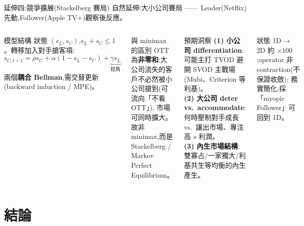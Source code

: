 \documentclass[aspectratio=169,11pt,fontset=none]{ctexbeamer}
\begin{document}
\begin{frame}{延伸四:競爭擴展(Stackelberg 賽局)}
  自然延伸:大小公司賽局 —— Leader(Netflix)先動,Follower(Apple TV+)觀察後反應。
  \begin{columns}[T]
      \begin{block}{模型結構}
        \footnotesize
        狀態 $(s_L,s_C)$,$s_L+s_C\le1$。轉移加入對手搶客項:
        \[ s_{C,t+1}=\rho s_C+\alpha(1-s_L-s_C)+\underbrace{\gamma s_L}_{\text{挖角}} \]
        兩個\textbf{耦合 Bellman},需交替更新(backward induction / MPE)。
      \end{block}
      \begin{alertblock}{與 minimax 的區別}
        \footnotesize OTT 為\textbf{非零和}:大公司流失的客戶不必然被小公司搶到(可流向「不看 OTT」),
        市場可同時擴大。故非 minimax,而是 Stackelberg / Markov Perfect Equilibrium。
      \end{alertblock}
      \begin{exampleblock}{預期洞察}
        \footnotesize
        \textbf{(1) 小公司 differentiation}:可能主打 TVOD 避開 SVOD 主戰場(Mubi、Criterion 等利基)。\\
        \textbf{(2) 大公司 deter vs.\ accommodate}:何時壓制對手成長 vs.\ 讓出市場、專注高 $s$ 利潤。\\
        \textbf{(3) 內生市場結構}:雙寡占/一家獨大/利基共生等均衡的內生產生。
      \end{exampleblock}
      \footnotesize 狀態 1D$\to$2D 約 $\times100$;operator 非 contraction(不保證收斂);
      務實簡化:採「myopic Follower」可回到 1D。
  \end{columns}
\end{frame}

\section{結論}
\end{document}
